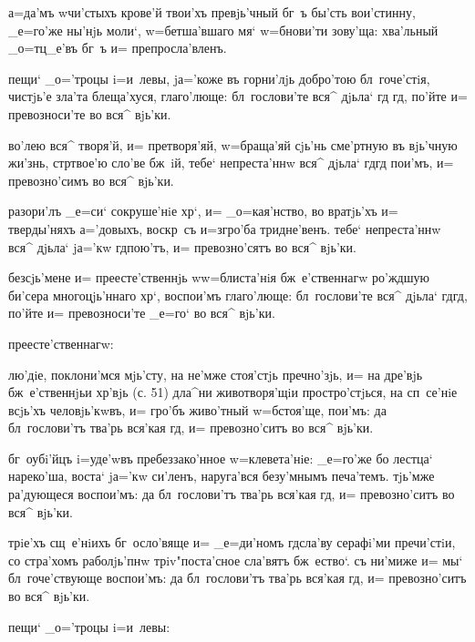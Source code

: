  а=да'мъ w\т чи'стыхъ крове'й твои'хъ 
превjь'чный бг~ъ бы'сть вои'стинну, _е=го'же ны'нjь 
моли`, w=бетша'вшаго мя` w=бнови'ти зову'ща: хва'льный 
_о=тц_е'въ бг~ъ и= препросла'вленъ.


 пещи` _о='троцы i=и~левы, jа='коже въ 
горни'лjь добро'тою бл~гоче'стiя, чистjь'е зла'та 
блеща'хуся, глаго'люще: бл~гослови'те вся^ дjьла` гд 
гд, по'йте и= превозноси'те во вся^ вjь'ки.

 во'лею вся^ творя'й, и= претворя'яй, w=браща'яй 
сjь'нь сме'ртную въ вjь'чную жи'знь, стр твое'ю 
сло'ве бж~iй, тебе` непреста'ннw вся^ дjьла` гд гд 
пои'мъ, и= превозно'симъ во вся^ вjь'ки.

 разори'лъ _е=си` сокруше'нiе хр`, и= 
_о=кая'нство, во вратjь'хъ и= тверды'няхъ а='довыхъ, 
воскр~съ и=з\ъ гро'ба тридне'венъ. тебе` непреста'ннw 
вся^ дjьла` jа='кw гд пою'тъ, и= превозно'сятъ во вся^ 
вjь'ки.

  без\ъ сjь'мене и= 
преесте'ственнjь w\т w=блиста'нiя бж~е'ственнагw ро'ждшую 
би'сера многоцjь'ннаго хр`, воспои'мъ глаго'люще: 
бл~гослови'те вся^ дjьла` гд гд, по'йте и= 
превозноси'те _е=го` во вся^ вjь'ки.

   преесте'ственнагw:

 лю'дiе, поклони'мся мjь'сту, на не'мже 
стоя'стjь преч но'зjь, и= на дре'вjь бж~е'ственнjьи 
хр'вjь (с. 51) дла^ни животворя'щiи простро'стjься, 
на сп~се'нiе всjь'хъ человjь'кwвъ, и= гро'бъ живо'тный 
w=бстоя'ще, пои'мъ: да бл~гослови'тъ тва'рь вся'кая 
гд, и= превозно'ситъ во вся^ вjь'ки.

 бг~оубi'йцъ i=уде'wвъ пребеззако'нное 
w=клевета'нiе: _е=го'же бо лестца` нареко'ша, воста` 
jа='кw си'ленъ, наруга'вся безу'мнымъ печа'темъ. тjь'мже 
ра'дующеся воспои'мъ: да бл~гослови'тъ тва'рь вся'кая 
гд, и= превозно'ситъ во вся^ вjь'ки.

  трiе'хъ сщ~е'нiихъ бг~осло'вяще и= 
_е=ди'номъ гд сла'ву серафi'ми пречи'стiи, со 
стра'хомъ раболjь'пнw трiv"поста'сное сла'вятъ бж~ество`. 
съ ни'миже и= мы` бл~гоче'ствующе воспои'мъ: да 
бл~гослови'тъ тва'рь вся'кая гд, и= превозно'ситъ во 
вся^ вjь'ки.

   пещи` _о='троцы i=и~левы:


